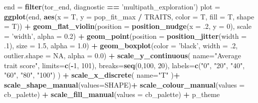 \documentclass[]{book}
\newenvironment{Shaded}{\begin{snugshade}}{\end{snugshade}}
\newcommand{\DataTypeTok}[1]{\textcolor[rgb]{0.13,0.29,0.53}{#1}}
\newcommand{\DecValTok}[1]{\textcolor[rgb]{0.00,0.00,0.81}{#1}}
\newcommand{\FloatTok}[1]{\textcolor[rgb]{0.00,0.00,0.81}{#1}}
\newcommand{\KeywordTok}[1]{\textcolor[rgb]{0.13,0.29,0.53}{\textbf{#1}}}
\newcommand{\NormalTok}[1]{#1}
\newcommand{\OperatorTok}[1]{\textcolor[rgb]{0.81,0.36,0.00}{\textbf{#1}}}
\newcommand{\OtherTok}[1]{\textcolor[rgb]{0.56,0.35,0.01}{#1}}
\newcommand{\StringTok}[1]{\textcolor[rgb]{0.31,0.60,0.02}{#1}}
\begin{document}
\begin{Shaded}
\begin{Highlighting}[]
\NormalTok{end =}\StringTok{ }\KeywordTok{filter}\NormalTok{(tor_end, diagnostic }\OperatorTok{==}\StringTok{ 'multipath_exploration'}\NormalTok{)}
\NormalTok{plot =}\StringTok{ }\KeywordTok{ggplot}\NormalTok{(end, }\KeywordTok{aes}\NormalTok{(}\DataTypeTok{x =}\NormalTok{ T, }\DataTypeTok{y =}\NormalTok{ pop_fit_max }\OperatorTok{/}\StringTok{ }\NormalTok{TRAITS, }\DataTypeTok{color =}\NormalTok{ T, }\DataTypeTok{fill =}\NormalTok{ T, }\DataTypeTok{shape =}\NormalTok{ T)) }\OperatorTok{+}
\StringTok{  }\KeywordTok{geom_flat_violin}\NormalTok{(}\DataTypeTok{position =} \KeywordTok{position_nudge}\NormalTok{(}\DataTypeTok{x =} \FloatTok{.2}\NormalTok{, }\DataTypeTok{y =} \DecValTok{0}\NormalTok{), }\DataTypeTok{scale =} \StringTok{'width'}\NormalTok{, }\DataTypeTok{alpha =} \FloatTok{0.2}\NormalTok{) }\OperatorTok{+}
\StringTok{  }\KeywordTok{geom_point}\NormalTok{(}\DataTypeTok{position =} \KeywordTok{position_jitter}\NormalTok{(}\DataTypeTok{width =} \FloatTok{.1}\NormalTok{), }\DataTypeTok{size =} \FloatTok{1.5}\NormalTok{, }\DataTypeTok{alpha =} \FloatTok{1.0}\NormalTok{) }\OperatorTok{+}
\StringTok{  }\KeywordTok{geom_boxplot}\NormalTok{(}\DataTypeTok{color =} \StringTok{'black'}\NormalTok{, }\DataTypeTok{width =} \FloatTok{.2}\NormalTok{, }\DataTypeTok{outlier.shape =} \OtherTok{NA}\NormalTok{, }\DataTypeTok{alpha =} \FloatTok{0.0}\NormalTok{) }\OperatorTok{+}
\StringTok{  }\KeywordTok{scale_y_continuous}\NormalTok{(}
    \DataTypeTok{name=}\StringTok{"Average trait score"}\NormalTok{,}
    \DataTypeTok{limits=}\KeywordTok{c}\NormalTok{(}\OperatorTok{-}\DecValTok{1}\NormalTok{, }\DecValTok{101}\NormalTok{),}
    \DataTypeTok{breaks=}\KeywordTok{seq}\NormalTok{(}\DecValTok{0}\NormalTok{,}\DecValTok{100}\NormalTok{, }\DecValTok{20}\NormalTok{),}
    \DataTypeTok{labels=}\KeywordTok{c}\NormalTok{(}\StringTok{"0"}\NormalTok{, }\StringTok{"20"}\NormalTok{, }\StringTok{"40"}\NormalTok{, }\StringTok{"60"}\NormalTok{, }\StringTok{"80"}\NormalTok{, }\StringTok{"100"}\NormalTok{)}
\NormalTok{  ) }\OperatorTok{+}
\StringTok{  }\KeywordTok{scale_x_discrete}\NormalTok{(}
    \DataTypeTok{name=}\StringTok{"T"}
\NormalTok{  )}\OperatorTok{+}
\StringTok{  }\KeywordTok{scale_shape_manual}\NormalTok{(}\DataTypeTok{values=}\NormalTok{SHAPE)}\OperatorTok{+}
\StringTok{  }\KeywordTok{scale_colour_manual}\NormalTok{(}\DataTypeTok{values =}\NormalTok{ cb_palette) }\OperatorTok{+}
\StringTok{  }\KeywordTok{scale_fill_manual}\NormalTok{(}\DataTypeTok{values =}\NormalTok{ cb_palette) }\OperatorTok{+}
\StringTok{  }\NormalTok{p_theme}


\end{Highlighting}
\end{Shaded}
\end{document}
